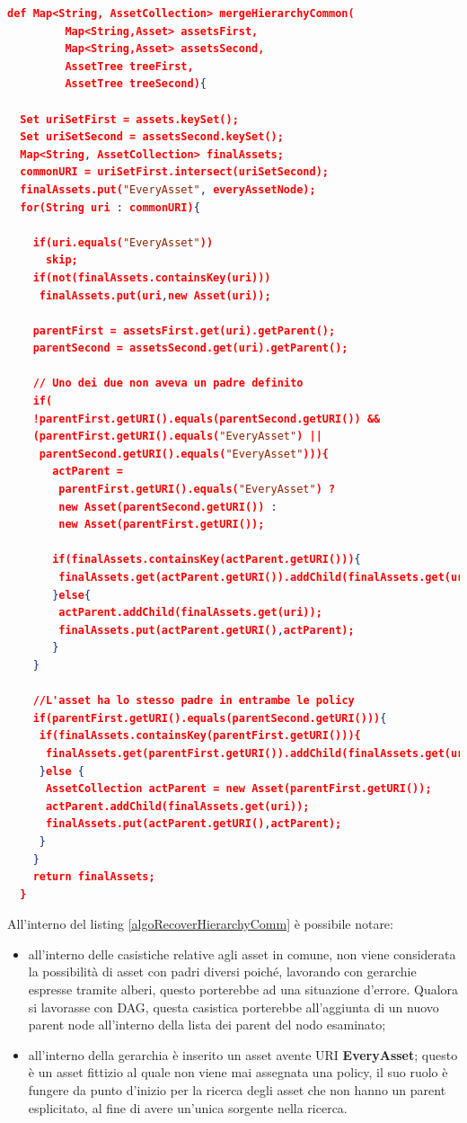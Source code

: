 \documentclass[12pt,a4paper,twoside]{book}
\begin{document}
\begin{lstlisting}[language=Json,firstnumber=1,caption={L'algoritmo ha prestazioni lineari in proporzione al più più grande degli insiemi di asset},label=algoRecoverHierarchyComm,captionpos=b]
def Map<String, AssetCollection> mergeHierarchyCommon(
         Map<String,Asset> assetsFirst,
         Map<String,Asset> assetsSecond,
         AssetTree treeFirst,
         AssetTree treeSecond){
         
  Set uriSetFirst = assets.keySet();
  Set uriSetSecond = assetsSecond.keySet();
  Map<String, AssetCollection> finalAssets;
  commonURI = uriSetFirst.intersect(uriSetSecond);
  finalAssets.put("EveryAsset", everyAssetNode);
  for(String uri : commonURI){
  
    if(uri.equals("EveryAsset"))
      skip;  
    if(not(finalAssets.containsKey(uri)))
     finalAssets.put(uri,new Asset(uri));

    parentFirst = assetsFirst.get(uri).getParent();
    parentSecond = assetsSecond.get(uri).getParent();
    
    // Uno dei due non aveva un padre definito
    if(
    !parentFirst.getURI().equals(parentSecond.getURI()) && 
    (parentFirst.getURI().equals("EveryAsset") ||
     parentSecond.getURI().equals("EveryAsset"))){
       actParent =
        parentFirst.getURI().equals("EveryAsset") ?
        new Asset(parentSecond.getURI()) :
        new Asset(parentFirst.getURI());

       if(finalAssets.containsKey(actParent.getURI())){
        finalAssets.get(actParent.getURI()).addChild(finalAssets.get(uri));
       }else{
        actParent.addChild(finalAssets.get(uri));
        finalAssets.put(actParent.getURI(),actParent);
       }
    }
    
    //L'asset ha lo stesso padre in entrambe le policy
    if(parentFirst.getURI().equals(parentSecond.getURI())){
     if(finalAssets.containsKey(parentFirst.getURI())){
      finalAssets.get(parentFirst.getURI()).addChild(finalAssets.get(uri));
     }else {
      AssetCollection actParent = new Asset(parentFirst.getURI());
      actParent.addChild(finalAssets.get(uri));
      finalAssets.put(actParent.getURI(),actParent);
     }
    }
    return finalAssets;
  }
\end{lstlisting}
All'interno del listing \ref{algoRecoverHierarchyComm} è possibile notare:
\begin{itemize}
	\item all'interno delle casistiche relative agli asset in comune, non viene considerata la possibilità di asset con padri diversi poiché, lavorando con gerarchie espresse tramite alberi, questo porterebbe ad una situazione d'errore. Qualora si lavorasse con DAG, questa casistica porterebbe all'aggiunta di un nuovo parent node all'interno della lista dei parent del nodo esaminato;
	\item all'interno della gerarchia è inserito un asset avente URI \textbf{EveryAsset}; questo è un asset fittizio al quale non viene mai assegnata una policy, il suo ruolo è fungere da punto d'inizio per la ricerca degli asset che non hanno un parent esplicitato, al fine di avere un'unica sorgente nella ricerca.
\end{itemize}
\end{document}
